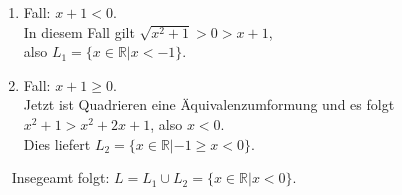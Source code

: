 	\begin{enumerate}
	\item Fall: $x+1<0$.\\
	In diesem Fall gilt $\sqrt{x^2+1}>0>x+1$,\\
	also $L_1=\{x\in\mathbb{R}|x<-1\}$.
	\item Fall: $x+1\geq 0$.\\
	Jetzt ist Quadrieren eine Äquivalenzumformung und es folgt $x^2+1>x^2+2x+1$, also $x<0$.\\
	Dies liefert $L_2=\{x\in\mathbb{R}|-1\geq x <0 \}.$
	\end{enumerate}
	~\newline
	Insegeamt folgt: $L=L_1\cup L_2 = \{x\in \mathbb{R}|x<0\}$.
		
	
	
	
         
